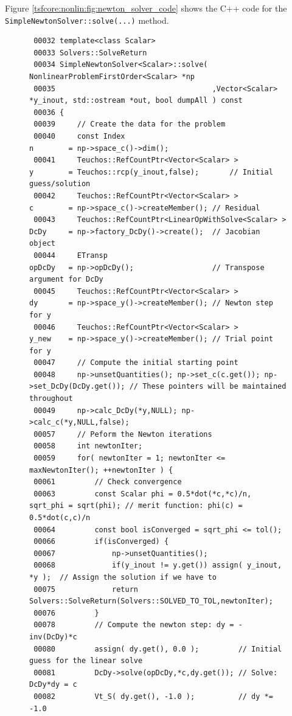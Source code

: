 Figure \ref{tsfcore:nonlin:fig:newton_solver_code} shows the C++ code for the
\texttt{Simple\-Newton\-Solver\-::solve(...)} method.
%
{\bsinglespace
\begin{figure}
\begin{minipage}{\textwidth}
{\tiny\begin{verbatim}
 00032 template<class Scalar>
 00033 Solvers::SolveReturn
 00034 SimpleNewtonSolver<Scalar>::solve( NonlinearProblemFirstOrder<Scalar> *np
 00035                                    ,Vector<Scalar> *y_inout, std::ostream *out, bool dumpAll ) const
 00036 {
 00039     // Create the data for the problem
 00040     const Index                                       n        = np->space_c()->dim();
 00041     Teuchos::RefCountPtr<Vector<Scalar> >             y        = Teuchos::rcp(y_inout,false);       // Initial guess/solution
 00042     Teuchos::RefCountPtr<Vector<Scalar> >             c        = np->space_c()->createMember(); // Residual
 00043     Teuchos::RefCountPtr<LinearOpWithSolve<Scalar> >  DcDy     = np->factory_DcDy()->create();  // Jacobian object
 00044     ETransp                                           opDcDy   = np->opDcDy();                  // Transpose argument for DcDy
 00045     Teuchos::RefCountPtr<Vector<Scalar> >             dy       = np->space_y()->createMember(); // Newton step for y
 00046     Teuchos::RefCountPtr<Vector<Scalar> >             y_new    = np->space_y()->createMember(); // Trial point for y
 00047     // Compute the initial starting point
 00048     np->unsetQuantities(); np->set_c(c.get()); np->set_DcDy(DcDy.get()); // These pointers will be maintained throughout
 00049     np->calc_DcDy(*y,NULL); np->calc_c(*y,NULL,false);
 00057     // Peform the Newton iterations
 00058     int newtonIter;
 00059     for( newtonIter = 1; newtonIter <= maxNewtonIter(); ++newtonIter ) {
 00061         // Check convergence
 00063         const Scalar phi = 0.5*dot(*c,*c)/n, sqrt_phi = sqrt(phi); // merit function: phi(c) = 0.5*dot(c,c)/n
 00064         const bool isConverged = sqrt_phi <= tol();
 00066         if(isConverged) {
 00067             np->unsetQuantities();
 00068             if(y_inout != y.get()) assign( y_inout, *y );  // Assign the solution if we have to
 00075             return Solvers::SolveReturn(Solvers::SOLVED_TO_TOL,newtonIter);
 00076         }
 00078         // Compute the newton step: dy = -inv(DcDy)*c
 00080         assign( dy.get(), 0.0 );         // Initial guess for the linear solve
 00081         DcDy->solve(opDcDy,*c,dy.get()); // Solve: DcDy*dy = c
 00082         Vt_S( dy.get(), -1.0 );          // dy *= -1.0

\end{verbatim}}
\end{minipage}
\end{figure}}
